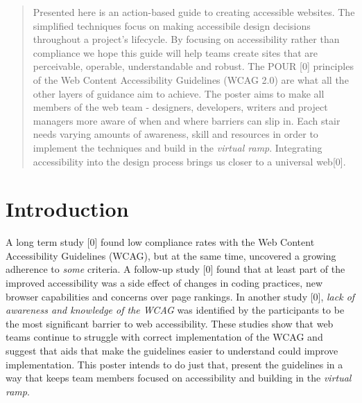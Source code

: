 \documentclass{acm_proc_article-sp}
\begin{document}
\maketitle
\begin{abstract}
Presented here is an action-based guide to creating accessible websites. The simplified techniques focus on making accessibile design decisions throughout a project's lifecycle. By focusing on accessibility rather than compliance we hope this guide will help teams create sites that are perceivable, operable, understandable and robust. The POUR [0] principles of the Web Content Accessibility Guidelines (WCAG 2.0) are what all the other layers of guidance aim to achieve. The poster aims to make all members of the web team - designers, developers, writers and project managers more aware of when and where barriers can slip in. Each stair needs varying amounts of awareness, skill and resources in order to implement the techniques and build in the \textit{virtual ramp}. Integrating accessibility into the design process brings us closer to a universal web[0].

\end{abstract}



\section{Introduction}
A long term study [0] found low compliance rates with the Web Content Accessibility Guidelines (WCAG), but at the same time, uncovered a growing adherence to \textit{some} criteria. A follow-up study [0] found that at least part of the improved accessibility was a side effect of changes in coding practices, new browser capabilities and concerns over page rankings. In another study [0], \textit{lack of awareness and knowledge of the WCAG} was identified by the participants to be the most significant barrier to web accessibility. These studies show that web teams continue to struggle with correct implementation of the WCAG and suggest that aids that make the guidelines easier to understand could improve implementation. This poster intends to do just that, present the guidelines in a way that keeps team members focused on accessibility and building in the \textit{virtual ramp}. 
\end{document}
